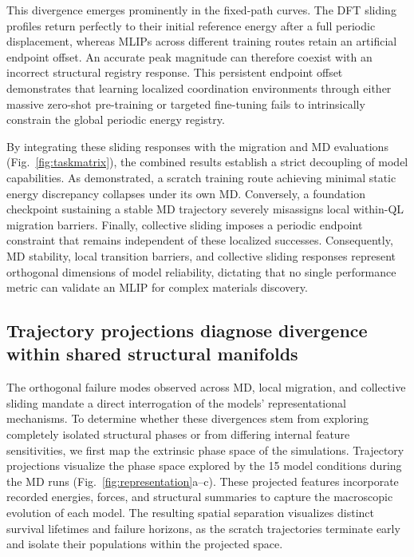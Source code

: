 \documentclass[pdflatex,sn-mathphys-num]{sn-jnl}
\begin{document}
This divergence emerges prominently in the fixed-path curves. The DFT sliding profiles return perfectly to their initial reference energy after a full periodic displacement, whereas MLIPs across different training routes retain an artificial endpoint offset. An accurate peak magnitude can therefore coexist with an incorrect structural registry response. This persistent endpoint offset demonstrates that learning localized coordination environments through either massive zero-shot pre-training or targeted fine-tuning fails to intrinsically constrain the global periodic energy registry.

By integrating these sliding responses with the migration and MD evaluations (Fig.~\ref{fig:taskmatrix}), the combined results establish a strict decoupling of model capabilities. As demonstrated, a scratch training route achieving minimal static energy discrepancy collapses under its own MD. Conversely, a foundation checkpoint sustaining a stable MD trajectory severely misassigns local within-QL migration barriers. Finally, collective sliding imposes a periodic endpoint constraint that remains independent of these localized successes. Consequently, MD stability, local transition barriers, and collective sliding responses represent orthogonal dimensions of model reliability, dictating that no single performance metric can validate an MLIP for complex materials discovery.

\subsection{Trajectory projections diagnose divergence within shared structural manifolds}\label{sec:representations}

The orthogonal failure modes observed across MD, local migration, and collective sliding mandate a direct interrogation of the models' representational mechanisms. To determine whether these divergences stem from exploring completely isolated structural phases or from differing internal feature sensitivities, we first map the extrinsic phase space of the simulations. Trajectory projections visualize the phase space explored by the 15 model conditions during the MD runs (Fig.~\ref{fig:representation}a--c). These projected features incorporate recorded energies, forces, and structural summaries to capture the macroscopic evolution of each model. The resulting spatial separation visualizes distinct survival lifetimes and failure horizons, as the scratch trajectories terminate early and isolate their populations within the projected space.
\end{document}
